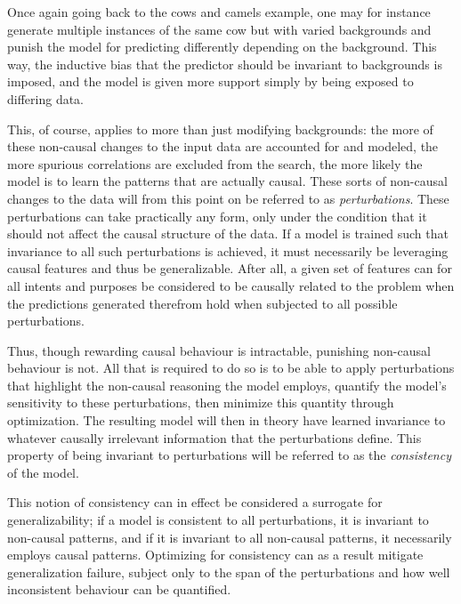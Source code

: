 Once again going back to the cows and camels example, one may for instance generate multiple instances of the same cow but with varied backgrounds and punish the model for predicting differently depending on the background. This way, the inductive bias that the predictor should be invariant to backgrounds is imposed, and the model is given more support simply by being exposed to differing data. 

This, of course, applies to more than just modifying backgrounds: the more of these non-causal changes to the input data are accounted for and modeled, the more spurious correlations are excluded from the search, the more likely the model is to learn the patterns that are actually causal. These sorts of non-causal changes to the data will from this point on be referred to as \textit{perturbations}. These perturbations can take practically any form, only under the condition that it should not affect the causal structure of the data. If a model is trained such that invariance to all such perturbations is achieved, it must necessarily be leveraging causal features and thus be generalizable. After all, a given set of features can for all intents and purposes be considered to be causally related to the problem when the predictions generated therefrom hold when subjected to all possible perturbations. 

Thus, though rewarding causal behaviour is intractable, punishing non-causal behaviour is not. All that is required to do so is to be able to apply perturbations that highlight the non-causal reasoning the model employs, quantify the model's sensitivity to these perturbations, then minimize this quantity through optimization. The resulting model will then in theory have learned invariance to whatever causally irrelevant information that the perturbations define. This property of being invariant to perturbations will be referred to as the \textit{consistency} of the model. 

This notion of consistency can in effect be considered a surrogate for generalizability; if a model is consistent to all perturbations, it is invariant to non-causal patterns, and if it is invariant to all non-causal patterns, it necessarily employs causal patterns. Optimizing for consistency can as a result mitigate generalization failure, subject only to the span of the perturbations and how well inconsistent behaviour can be quantified.

